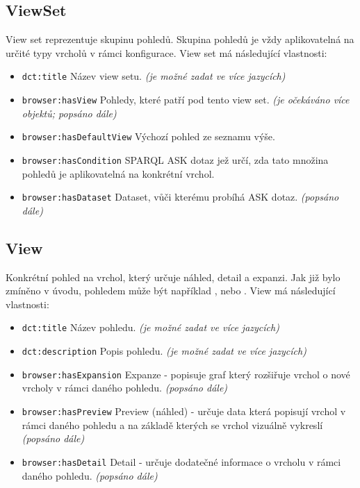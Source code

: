 \subsection{ViewSet} \label{pozadavky-view-sets}
View set reprezentuje skupinu pohledů. Skupina pohledů je vždy aplikovatelná na určité typy vrcholů v rámci konfigurace. View set má následující vlastnosti:
\begin{itemize}
    \item \texttt{dct:title} Název view setu. \textit{(je možné zadat ve více jazycích)}
    \item \texttt{browser:hasView} Pohledy, které patří pod tento view set. \textit{(je očekáváno více objektů; popsáno dále)}
    \item \texttt{browser:hasDefaultView} Výchozí pohled ze seznamu výše.
    \item \texttt{browser:hasCondition} SPARQL ASK dotaz jež určí, zda tato množina pohledů je aplikovatelná na konkrétní vrchol.
    \item \texttt{browser:hasDataset} Dataset, vůči kterému probíhá ASK dotaz. \textit{(popsáno dále)}
\end{itemize}

\subsection{View} \label{pozadavky-view}
Konkrétní pohled na vrchol, který určuje náhled, detail a expanzi. Jak již bylo zmíněno v úvodu, pohledem může být například , nebo . View má následující vlastnosti:

\begin{itemize}
    \item \texttt{dct:title} Název pohledu. \textit{(je možné zadat ve více jazycích)}
    \item \texttt{dct:description} Popis pohledu. \textit{(je možné zadat ve více jazycích)}
    \item \texttt{browser:hasExpansion} Expanze -  popisuje graf který rozšiřuje vrchol o nové vrcholy v rámci daného pohledu. \textit{(popsáno dále)}
    \item \texttt{browser:hasPreview} Preview (náhled) - určuje data která popisují vrchol v rámci daného pohledu a na základě kterých se vrchol vizuálně vykreslí \textit{(popsáno dále)}
    \item \texttt{browser:hasDetail} Detail - určuje dodatečné informace o vrcholu v rámci daného pohledu. \textit{(popsáno dále)}
\end{itemize}

